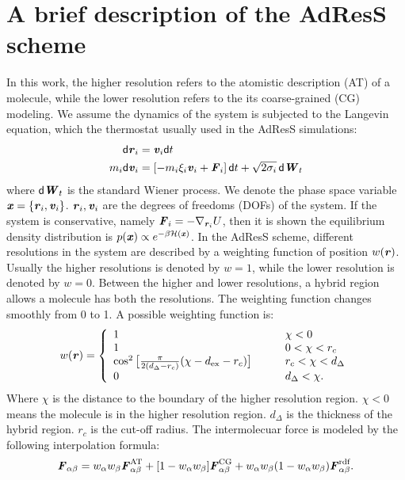 \documentclass[aip,jcp,a4paper,reprint,onecolumn]{revtex4-1}
\newcommand{\vect}[1]{\textbf{\textit{#1}}}
\newcommand{\dd}[1]{\textsf{#1}}
\newcommand{\AT}{{\textrm{{AT}}}}
\newcommand{\CG}{{\textrm{CG}}}
\newcommand{\HY}{{\Delta}}
\newcommand{\rdf}{{\textrm{rdf}}}
\begin{document}
\section{A brief description of the AdResS scheme}

In this work, the higher resolution refers to the atomistic
description (AT) of a molecule, while the lower resolution refers to
the its coarse-grained (CG) modeling.  We assume the dynamics of the
system is subjected to the Langevin equation, which the thermostat
usually used in the AdResS simulations:
\begin{align}
  \dd d\vect r_i &= \vect v_i\dd dt\\
  m_i\dd d\vect v_i &= [-m_i\xi_i\vect v_i + \vect F_i]\,\dd dt + \sqrt{2\sigma_i}\,\dd d\vect W_t
\end{align}
where $\dd d\vect W_t$ is the standard Wiener process. We denote the
phase space variable $\vect x = \{\vect r_i, \vect v_i\}$. $\vect r_i,
\vect v_i$ are the degrees of freedoms (DOFs) of the system.  If the
system is conservative, namely $\vect F_i = -\nabla_{\vect r_i}U$,
then it is shown the equilibrium density distribution is $p(\vect
x)\propto e^{-\beta\mathcal H(\vect x)}$. In the AdResS scheme,
different resolutions in the system are described by a weighting
function of position $w(\vect r)$. Usually the higher resolutions is
denoted by $w = 1$, while the lower resolution is denoted by $w = 0$.
Between the higher and lower resolutions, a hybrid region allows a 
molecule has both the resolutions. The weighting function changes smoothly
from 0 to 1. A possible weighting function is:
\begin{align}\label{eqn:new-w}
  w(\vect r) =
  \left\{
    \begin{array}{lcl}
      1 &\quad& \chi < 0\\
      1  && 0 < \chi < r_c\\
      \cos^2\big[\frac{\pi}{2(d_{\HY} - r_c)} (\chi - d_{\textrm{ex}} - r_c)\big] && r_c < \chi < d_{\HY} \\
      0 &&  d_{\HY}  < \chi.
    \end{array}
  \right.
\end{align}
Where $\chi$ is the distance to the boundary of the higher resolution
region. $\chi < 0$ means the molecule is in the higher resolution
region.  $d_{\HY}$ is the thickness of the hybrid region. $r_c$ is the
cut-off radius.  The intermolecuar force is modeled by the following
interpolation formula:
\begin{align}
  \vect F_{\alpha\beta} =
  w_\alpha w_\beta\vect F^{\AT}_{\alpha\beta} +
  [1-w_\alpha w_\beta]\vect F^{\CG}_{\alpha\beta} +
  w_\alpha w_\beta (1-w_\alpha w_\beta)\vect F_{\alpha\beta}^{\rdf}.
\label{grf}
\end{align}
\end{document}
